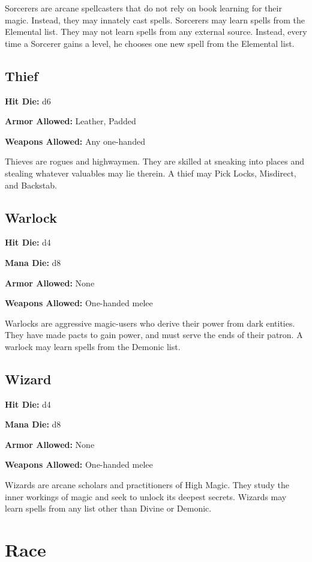 \begin{multicols}{2}
Sorcerers are arcane spellcasters that do not rely on book learning for their
magic. Instead, they may innately cast spells. Sorcerers may learn spells from
the Elemental list. They may not learn spells from any external source. Instead,
every time a Sorcerer gains a level, he chooses one new spell from the Elemental
list.

\subsection{Thief}

\textbf{Hit Die:} d6

\textbf{Armor Allowed:} Leather, Padded

\textbf{Weapons Allowed:} Any one-handed

Thieves are rogues and highwaymen. They are skilled at sneaking into places and
stealing whatever valuables may lie therein. A thief may Pick Locks, Misdirect,
and Backstab.

\subsection{Warlock}

\textbf{Hit Die:} d4

\textbf{Mana Die:} d8

\textbf{Armor Allowed:} None

\textbf{Weapons Allowed:} One-handed melee

Warlocks are aggressive magic-users who derive their power from dark entities.
They have made pacts to gain power, and must serve the ends of their patron.
A warlock may learn spells from the Demonic list.

\subsection{Wizard}

\textbf{Hit Die:} d4

\textbf{Mana Die:} d8

\textbf{Armor Allowed:} None

\textbf{Weapons Allowed:} One-handed melee

Wizards are arcane scholars and practitioners of High Magic. They study the inner
workings of magic and seek to unlock its deepest secrets. Wizards may learn
spells from any list other than Divine or Demonic.

\section{Race}


\end{multicols}
